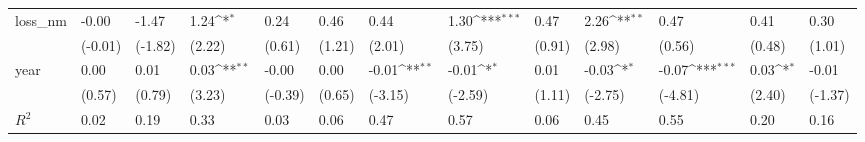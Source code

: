 \def\sym#1{\ifmmode^{#1}\else\(^{#1}\)\fi}
\begin{tabular}{p{1.5cm} p{1.7cm} p{1.7cm} p{1.7cm}  p{1.7cm} p{1.7cm} p{1.7cm} p{1.7cm} p{1.7cm}  p{1.7cm} p{1.7cm} p{1.7cm} p{1.7cm} }
\hline
loss\_nm         &    -0.00         &    -1.47         &     1.24\sym{*}  &     0.24         &     0.46         &     0.44         &     1.30\sym{***}&     0.47         &     2.26\sym{**} &     0.47         &     0.41         &     0.30         \\
                &  (-0.01)         &  (-1.82)         &   (2.22)         &   (0.61)         &   (1.21)         &   (2.01)         &   (3.75)         &   (0.91)         &   (2.98)         &   (0.56)         &   (0.48)         &   (1.01)         \\
year            &     0.00         &     0.01         &     0.03\sym{**} &    -0.00         &     0.00         &    -0.01\sym{**} &    -0.01\sym{*}  &     0.01         &    -0.03\sym{*}  &    -0.07\sym{***}&     0.03\sym{*}  &    -0.01         \\
                &   (0.57)         &   (0.79)         &   (3.23)         &  (-0.39)         &   (0.65)         &  (-3.15)         &  (-2.59)         &   (1.11)         &  (-2.75)         &  (-4.81)         &   (2.40)         &  (-1.37)         \\
\hline
\(R^{2}\)       &     0.02         &     0.19         &     0.33         &     0.03         &     0.06         &     0.47         &     0.57         &     0.06         &     0.45         &     0.55         &     0.20         &     0.16         \\
\end{tabular}
\def\sym#1{\ifmmode^{#1}\else\(^{#1}\)\fi}
